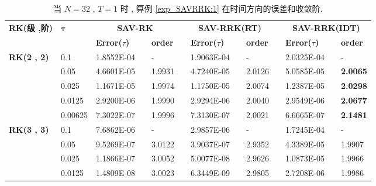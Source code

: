	\begin{table}[H]\scriptsize
		\centering
		\caption{当 $N=32$ , $T = 1$ 时 , 算例 \ref{exp_SAVRRK:1}  在时间方向的误差和收敛阶.}
		\begin{tabular}{lllllrlrlrlrlrl}
		\toprule
		\multicolumn{2}{l}{\multirow{2}[3]{*}{\textbf{RK(级 ,阶)}}} & \multicolumn{2}{l}{\multirow{2}[3]{*}{$\bm{\tau}$}} & \multicolumn{3}{c}{\textbf{SAV-RK}} &       & \multicolumn{3}{c}{\textbf{SAV-RRK(RT)}} &       & \multicolumn{3}{c}{\textbf{SAV-RRK(IDT)}} \\
		\cmidrule{5-7}\cmidrule{9-11}\cmidrule{13-15}    \multicolumn{2}{l}{} & \multicolumn{2}{l}{} & \textbf{Error($\tau$)} &       & \textbf{order} &       & \textbf{Error($\tau$)} &       & \textbf{order} &       & \textbf{Error($\tau$)} &       & \textbf{order} \\
		\hline
		\multicolumn{2}{l}{\multirow{5}[0]{*}{\textbf{RK(2 , 2)}}} & \multicolumn{2}{l}{0.1} & 1.8552E-04 &       & -     &       & 1.9063E-04 &       & -     &       & 2.0325E-04 &       & - \\
		\multicolumn{2}{l}{} & \multicolumn{2}{l}{0.05} & 4.6601E-05 &       & 1.9931  &       & 4.7240E-05 &       & 2.0126  &       & 5.0585E-05 &       & \textbf{2.0065}  \\
		\multicolumn{2}{l}{} & \multicolumn{2}{l}{0.025} & 1.1671E-05 &       & 1.9974  &       & 1.1750E-05 &       & 2.0074  &       & 1.2387E-05 &       & \textbf{2.0298}  \\
		\multicolumn{2}{l}{} & \multicolumn{2}{l}{0.0125} & 2.9200E-06 &       & 1.9990  &       & 2.9294E-06 &       & 2.0040  &       & 2.9549E-06 &       & \textbf{2.0677}  \\
		\multicolumn{2}{l}{} & \multicolumn{2}{l}{0.00625} & 7.3022E-07 &       & 1.9996  &       & 7.3130E-07 &       & 2.0021  &       & 6.6665E-07 &       & \textbf{2.1481}  \\
		\multicolumn{2}{l}{\multirow{5}[0]{*}{\textbf{RK(3 , 3)}}} & \multicolumn{2}{l}{0.1} & 7.6862E-06 &       & -     &       & 2.9857E-06 &       & -     &       & 1.7245E-04 &       & - \\
		\multicolumn{2}{l}{} & \multicolumn{2}{l}{0.05} & 9.5269E-07 &       & 3.0122  &       & 3.9037E-07 &       & 2.9352  &       & 4.3389E-05 &       & 1.9907  \\
		\multicolumn{2}{l}{} & \multicolumn{2}{l}{0.025} & 1.1866E-07 &       & 3.0052  &       & 5.0077E-08 &       & 2.9626  &       & 1.0873E-05 &       & 1.9966  \\
		\multicolumn{2}{l}{} & \multicolumn{2}{l}{0.0125} & 1.4809E-08 &       & 3.0023  &       & 6.3449E-09 &       & 2.9805  &       & 2.7208E-06 &       & 1.9986  \\

\end{tabular}
\end{table}
